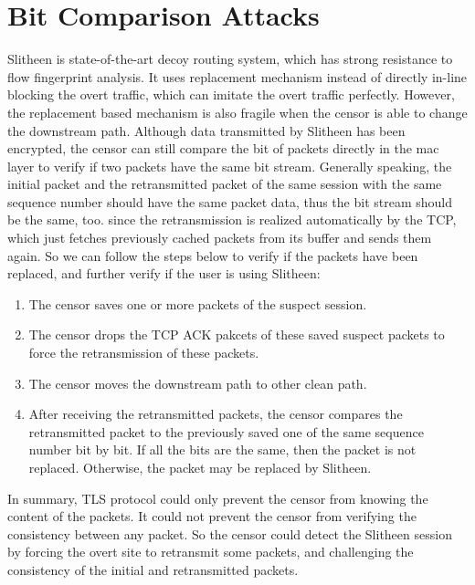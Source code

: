 \documentclass[conference]{IEEEtran}
\begin{document}
\section{Bit Comparison Attacks}
Slitheen is state-of-the-art decoy routing system, which has strong resistance to flow fingerprint analysis. It uses replacement mechanism instead of directly in-line blocking the overt traffic, which can imitate the overt traffic perfectly. However, the replacement based mechanism is also fragile when the censor is able to change the downstream path. Although data transmitted by Slitheen has been encrypted, the censor can still compare the bit of packets directly in the mac layer to verify if two packets have the same bit stream. Generally speaking, the initial packet and the retransmitted packet of the same session with the same sequence number should have the same packet data, thus the bit stream should be the same, too. since the retransmission is realized automatically by the TCP, which just fetches previously cached packets from its buffer and sends them again. So we can follow the steps below to verify if the packets have been replaced, and further verify if the user is using Slitheen:
\begin{enumerate}
	\item The censor saves one or more packets of the suspect session.
	\item The censor drops the TCP ACK pakcets of these saved suspect packets to force the retransmission of these packets.
	\item The censor moves the downstream path to other clean path.
	\item After receiving the retransmitted packets, the censor compares the retransmitted packet to the previously saved one of the same sequence number bit by bit. If all the bits are the same, then the packet is not replaced. Otherwise, the packet may be replaced by Slitheen.
\end{enumerate}
In summary, TLS protocol could only prevent the censor from knowing the content of the packets. It could not prevent the censor from verifying the  consistency between any packet. So the censor could detect the Slitheen session by forcing the overt site to retransmit some packets, and challenging the consistency of the initial and retransmitted packets.
\end{document}
